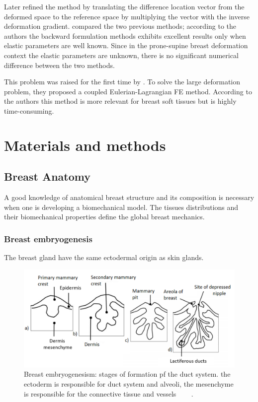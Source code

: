  Later \cite{eiben_breast_2014} refined the method by translating the difference location vector from the deformed space to the reference space by multiplying the vector with the inverse deformation gradient.   \cite{eiben_breast_2014} compared the two previous methods; according to the authors the backward formulation methods exhibits excellent results only when elastic parameters are well known. Since in the prone-supine breast deformation context the elastic parameters are unknown, there is no significant numerical difference between the two methods.   
 
  This problem was raised for the first time by \cite{kuhlmann_mechanical_2013}. To solve the large deformation problem, they proposed a coupled Eulerian-Lagrangian FE method. According to the authors this method is more relevant for breast soft tissues but is highly time-consuming.   
 

\section{Materials and methods}
\subsection{Breast Anatomy}

A good knowledge of anatomical breast structure and its composition is necessary when one is developing a biomechanical model.  The tissues distributions and their biomechanical properties define the global breast mechanics. 

 \subsubsection*{Breast embryogenesis}
The breast gland have the same ectodermal origin  as skin glands.

\begin{center}
\begin{figure}[!htb]
\includegraphics[width=\textwidth,height=\textheight,keepaspectratio]{figures/breast_evolution_my.png} 
\caption[Breast embryogenesism: stages of formation of the duct system. the ectoderm is responsible for duct system and alveoli, the mesenchyme is responsible for the connective tissue and vessels] {Breast embryogenesism: stages of formation pf the duct system. the ectoderm is responsible for duct system and alveoli, the mesenchyme is responsible for the connective tissue and vessels  ~~ ~\cite{shiffman_melvin_a_breast_2008}. }
\label{breastembryogenesis}
\end{figure}
\end{center}

